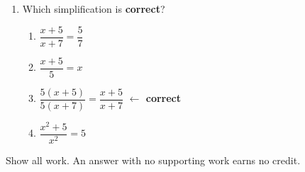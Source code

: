 \begin{enumerate}[leftmargin=1.8em, itemsep=6pt, topsep=5pt]
\item Which simplification is \textbf{correct}?
\begin{enumerate}[label=(\Alph*), leftmargin=2.2em, itemsep=1pt, topsep=2pt]
  \item $\dfrac{x+5}{x+7} = \dfrac{5}{7}$
  \item $\dfrac{x+5}{5} = x$
  \item $\dfrac{5(x+5)}{5(x+7)} = \dfrac{x+5}{x+7}$ \quad \textcolor{keyred}{\textbf{$\leftarrow$ correct}}
  \item $\dfrac{x^2+5}{x^2} = 5$
\end{enumerate}

\end{enumerate}


\noindent\small Show all work. An answer with no supporting work earns no credit.

